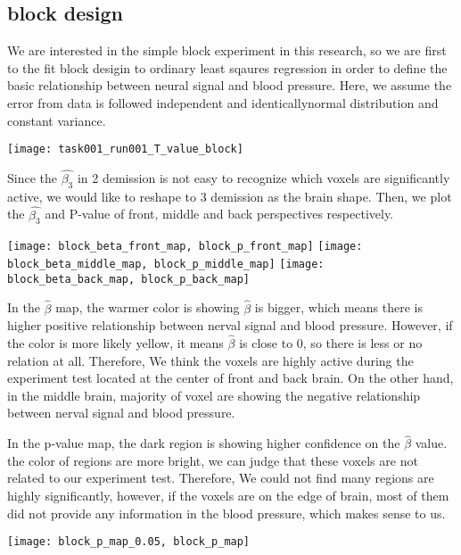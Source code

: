 \subsection{block design}
We are interested in the simple block experiment in this research, so we are 
first to the fit block desigin to ordinary least sqaures regression in order to
define the basic relationship between neural signal and blood pressure. Here, 
we assume the error from data is followed independent and identicallynormal
distribution and constant variance.

\label{Design matrix for block desgin}

\texttt{[image: task001\_run001\_T\_value\_block]}
\label{T-value of $\hat{\beta_{3}}$ in block design OLS}

Since the $\hat{\beta_{3}}$ in 2 demission is not easy to recognize which voxels
are significantly active, we would like to reshape to 3 demission as the brain 
shape. Then, we plot the $\hat{\beta_{3}}$ and P-value of front, middle and 
back perspectives respectively.

\texttt{[image: block\_beta\_front\_map, block\_p\_front\_map]}
\label{Front perspective of brain in block design}
\texttt{[image: block\_beta\_middle\_map, block\_p\_middle\_map]}
\label{Middle perspective of brain in block design}
\texttt{[image: block\_beta\_back\_map, block\_p\_back\_map]}
\label{Back perspective of brain in block design}

In the $\hat{\beta}$ map, the warmer color is showing $\hat{\beta}$ is 
bigger, which means there is higher positive relationship between nerval signal and
blood pressure. However, if the color is more likely yellow, it means 
$\hat{\beta}$ is close to 0, so there is less or no relation at all. 
Therefore, We think the voxels are highly active during the experiment test 
located at the center of front and back brain. On the other hand, in the middle
brain, majority of voxel are showing the negative relationship between nerval
signal and blood pressure.

In the p-value map, the dark region is showing higher confidence on the 
$\hat{\beta}$ value. the color of regions are more bright, we can judge that 
these voxels are not related to our experiment test. Therefore, We could not 
find many regions are highly significantly, however, if the voxels are on the 
edge of brain, most of them did not provide any information in the blood 
pressure, which makes sense to us.

\texttt{[image: block\_p\_map\_0.05, block\_p\_map]}
\label{highly significant voxels in the block design}

